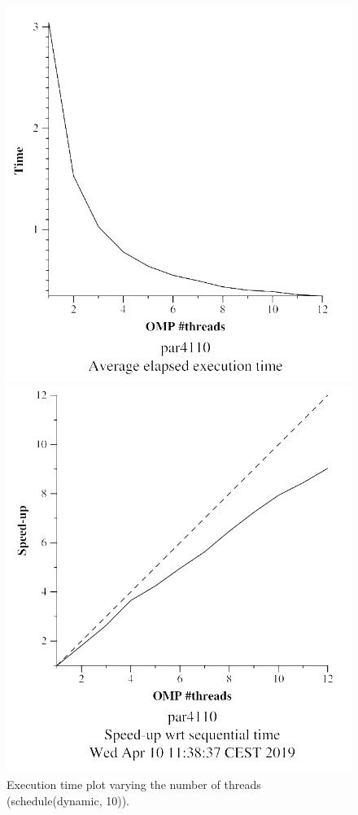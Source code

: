 \documentclass[12pt, a4paper]{article}
\begin{document}
\begin{figure}[H]
\centering
\begin{minipage}[b]{0.4\linewidth}
  \centering
  \includegraphics[scale=0.5]{./mandel-omp-10000-strong-omp-for-dynamic-800-time}
  \caption{Execution time plot varying the number of threads (schedule(dynamic, 10)).}
  \label{fig:mandel-omp-10000-strong-omp-for-dynamic-800-time}
\end{minipage}%
\hspace{0.5cm}
\begin{minipage}[b]{0.4\linewidth}
  \centering
  \includegraphics[scale=0.5]{./mandel-omp-10000-strong-omp-for-dynamic-800-speedup}

\end{minipage}
\end{figure}
\end{document}
